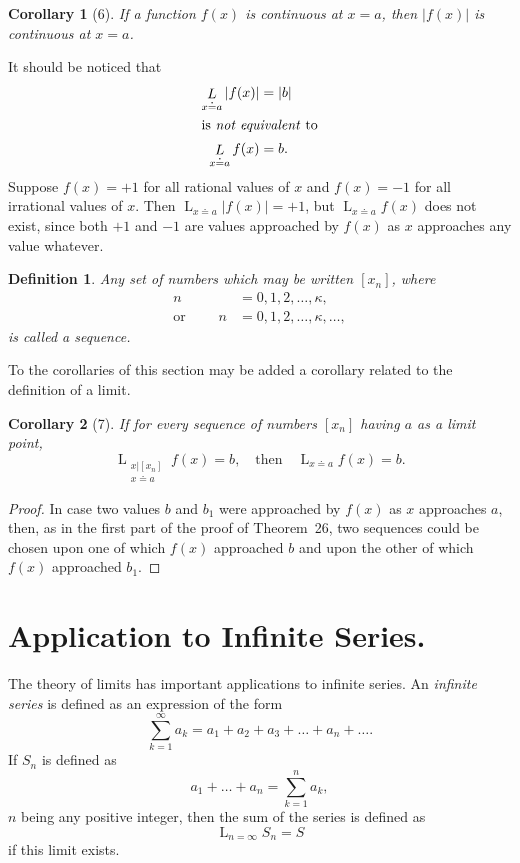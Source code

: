 \documentclass[a4paper,12pt]{book}[2004/02/16]
\providecommand{\hyperlink}[2]{#2}
\providecommand{\hypertarget}[2]{#2}
\theoremstyle{ilemma}
\theoremstyle{itheorem}
\theoremstyle{iother}
\theoremstyle{icorollary}
\theoremstyle{numcorollary}
\newtheorem{ncorollary}{Corollary}
\theoremstyle{idefinition}
\newtheorem*{definition}{Definition}
\begin{document}
\begin{ncorollary}[6]
If a function $f(x)$ is continuous at $x=a$, then $|f(x)|$ is
continuous at $x=a$.
\end{ncorollary}
It should be noticed that
\begin{align*}
  \mathop{L}_{x \doteq a} |f(x)|&= |b|\\
  \intertext{is \textit{not equivalent} to}
  \mathop{L}_{x \doteq a} f(x)&=b.
\end{align*}
Suppose $f(x) = +1$ for all rational values of $x$ and $f(x) =-1$ for
all irrational values of $x$. Then $\displaystyle\mathop{L}_{x \doteq
a} |f(x)|= +1$, but $\displaystyle\mathop{L}_{x \doteq a} f(x)$ does
not exist, since both $+1$ and $-1$ are values approached by $f(x)$ as
$x$ approaches any value whatever.

\begin{definition}
Any set of numbers which may be written $[x_n]$, where
\begin{align*}
  n &= 0, 1, 2, \ldots, \kappa, \\
  \text{or } \qquad n &= 0, 1, 2, \ldots, \kappa, \ldots,
\end{align*}
is called a \textit{sequence}.
\end{definition}

To the corollaries of this section may be added a corollary related to
the definition of a limit.

\begin{ncorollary}[7]
If for every sequence of numbers $[x_n]$ having $a$ as a limit point,
\[
  \mathop{L}_{\substack{x|[x_n] \\ x \doteq a}} f(x)=b,
  \quad\text{then}\quad \mathop{L}_{x \doteq a} f(x)=b.
\]
\end{ncorollary}
\begin{proof}
In case two values $b$ and $b_1$ were approached by $f(x)$ as $x$
approaches $a$, then, as in the first part of the proof of Theorem~\hyperlink{thm26}{26},
two sequences could be chosen upon one of which $f(x)$ approached $b$
and upon the other of which $f(x)$ approached $b_1$.
\end{proof}

\section{Application to Infinite Series.}\hypertarget{chIVsec3}{}%
The theory of limits has important applications to infinite series. An
\textit{infinite series} is defined as an expression of the form
\[
  \sum_{k=1}^\infty a_k = a_1 + a_2 + a_3 + \ldots + a_n + \ldots.
\]
If $S_n$ is defined as
\[
  a_1 + \ldots + a_n = \sum_{k=1}^n a_k,
\]
$n$ being any positive integer, then the sum of the series is
defined\label{dp71} as
\[
  \mathop{L}_{n=\infty} S_n = S
\]
if this limit exists.
\end{document}
